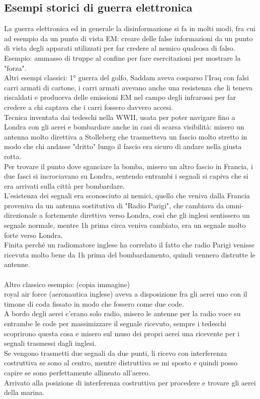 \documentclass[oneside, 12pt]{extbook}
\begin{document}
\subsection{Esempi storici di guerra elettronica}
La guerra elettronica ed in generale la disinformazione si fa in molti modi, fra cui ad esempio da un punto di vista EM: creare delle false informazioni da un punto di vista degli apparati utilizzati per far credere al nemico qualcosa di falso.
\\Esempio: ammasso di truppe al confine per fare esercitazioni per mostrare la "forza".
\\Altri esempi classici: 1° guerra del golfo, Saddam aveva cosparso l'Iraq con falsi carri armati di cartone, i carri armati avevano anche una resistenza che li teneva riscaldati e produceva delle emissioni EM nel campo degli infrarossi per far credere a chi captava che i carri fossero davvero accesi.
\\Tecnica inventata dai tedeschi nella WWII, usata per poter navigare fino a Londra con gli aerei e bombardare anche in casi di scarsa visibilità: misero un antenna molto direttiva a Stolleberg che trasmetteva un fascio molto stretto in modo che chi andasse "dritto" lungo il fascio era sicuro di andare nella giusta rotta.
\\Per trovare il punto dove sganciare la bomba, misero un altro fascio in Francia, i due fasci si incrociavano su Londra, sentendo entrambi i segnali si capiva che si era arrivati sulla città per bombardare.
\\L'esistenza dei segnali era sconosciuto ai nemici, quello che veniva dalla Francia proveniva da un antenna sostitutiva di "Radio Parigi", che cambiava da omni-direzionale a fortemente direttiva verso Londra, così che gli inglesi sentissero un segnale normale, mentre 1h prima circa veniva cambiato, era un segnale molto forte verso Londra.
\\Finita perché un radiomatore inglese ha correlato il fatto che radio Parigi venisse ricevuta molto bene da 1h prima del bombardamento, quindi vennero distrutte le antenne.
\\\\Altro classico esempio: (copia immagine)\\
royal air force (aeronautica inglese) aveva a disposizione fra gli aerei uno con il timone di coda fissato in modo che fossero come due code.
\\A bordo degli aerei c'erano solo radio, misero le antenne per la radio voce su entrambe le code per massimizzare il segnale ricevuto, sempre i tedeschi scoprirono questa cosa e misero sul muso dei propri aerei una ricevente per i segnali trasmessi dagli inglesi.
\\Se vengono trasmetti due segnali da due punti, li ricevo con interferenza costruttiva se sono al centro, mentre distruttiva se mi sposto e quindi posso capire se sono perfettamente allineato all'aereo.
\\Arrivato alla posizione di interferenza costruttiva per procedere e trovare gli aerei della marina.
\end{document}
